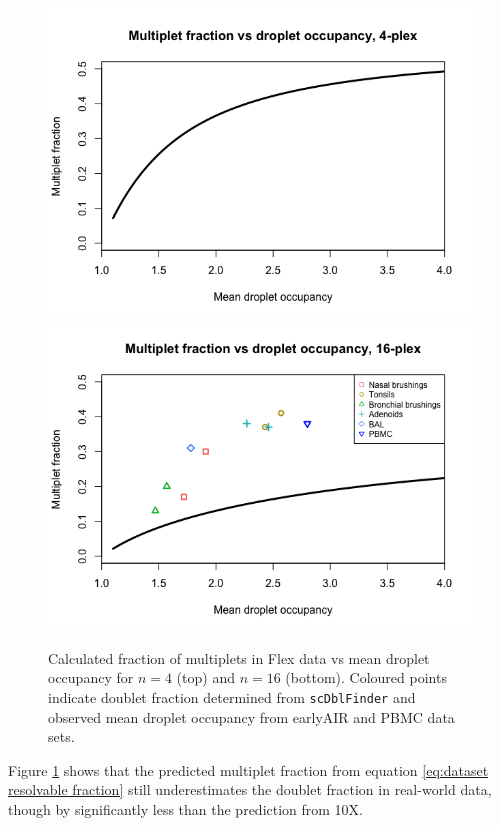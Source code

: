 \documentclass[unnumsec,webpdf,modern,large]{oup-authoring-template}
\begin{document}
	\begin{figure}
		\begin{center}
			\includegraphics[scale=0.3]{figures/observable_fraction_n4.png}	\\
			\includegraphics[scale=0.3]{figures/observable_fraction_n16.png}	
			\caption{Calculated fraction of multiplets in Flex data vs mean droplet occupancy for $n = 4$ (top) and $n = 16$ (bottom).
			Coloured points indicate doublet fraction determined from \texttt{scDblFinder} and observed mean droplet occupancy from earlyAIR and PBMC data sets.
			}		
			\label{fig: resolvable fraction observed}
		\end{center}
	\end{figure}
	Figure \ref{fig: resolvable fraction observed} shows that the predicted multiplet fraction from equation \eqref{eq:dataset resolvable fraction} still underestimates the doublet fraction in real-world data, though by significantly less than the prediction from 10X. 
\end{document}
